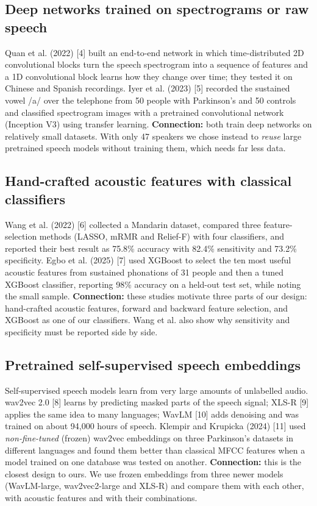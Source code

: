 \documentclass[11pt,a4paper]{article}
\begin{document}
\subsection{Deep networks trained on spectrograms or raw speech}
Quan et al. (2022) [4] built an end-to-end network in which time-distributed 2D convolutional blocks turn the speech spectrogram into a sequence of features and a 1D convolutional block learns how they change over time; they tested it on Chinese and Spanish recordings. Iyer et al. (2023) [5] recorded the sustained vowel /a/ over the telephone from 50 people with Parkinson's and 50 controls and classified spectrogram images with a pretrained convolutional network (Inception V3) using transfer learning. \textbf{Connection:} both train deep networks on relatively small datasets. With only 47 speakers we chose instead to \emph{reuse} large pretrained speech models without training them, which needs far less data.

\subsection{Hand-crafted acoustic features with classical classifiers}
Wang et al. (2022) [6] collected a Mandarin dataset, compared three feature-selection methods (LASSO, mRMR and Relief-F) with four classifiers, and reported their best result as 75.8\% accuracy with 82.4\% sensitivity and 73.2\% specificity. Egbo et al. (2025) [7] used XGBoost to select the ten most useful acoustic features from sustained phonations of 31 people and then a tuned XGBoost classifier, reporting 98\% accuracy on a held-out test set, while noting the small sample. \textbf{Connection:} these studies motivate three parts of our design: hand-crafted acoustic features, forward and backward feature selection, and XGBoost as one of our classifiers. Wang et al. also show why sensitivity and specificity must be reported side by side.

\subsection{Pretrained self-supervised speech embeddings}
Self-supervised speech models learn from very large amounts of unlabelled audio. wav2vec 2.0 [8] learns by predicting masked parts of the speech signal; XLS-R [9] applies the same idea to many languages; WavLM [10] adds denoising and was trained on about 94,000 hours of speech. Klempir and Krupicka (2024) [11] used \emph{non-fine-tuned} (frozen) wav2vec embeddings on three Parkinson's datasets in different languages and found them better than classical MFCC features when a model trained on one database was tested on another. \textbf{Connection:} this is the closest design to ours. We use frozen embeddings from three newer models (WavLM-large, wav2vec2-large and XLS-R) and compare them with each other, with acoustic features and with their combinations.
\end{document}
